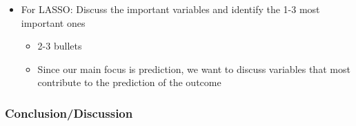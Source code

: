 \documentclass[
  letterpaper,
  DIV=11,
  numbers=noendperiod]{scrartcl}
\providecommand{\tightlist}{%
  \setlength{\itemsep}{0pt}\setlength{\parskip}{0pt}}\usepackage{longtable,booktabs,array}
\begin{document}
\begin{itemize}
  \begin{itemize}
  \tightlist
  \item
    2-3 bullets
  \item
    Interpreting the explanatory variable's relationship with IAT score
    is the most important thing to report!!

    \begin{itemize}
    \tightlist
    \item
      When doing this, make sure you account for ALL interactions: If
      your explanatory variable has multiple interactions and you are
      trying to interpret one, then what does that mean about the other
      variables involved in the other interactions? If this is
      confusing, please make an appointment with me!!
    \end{itemize}
  \end{itemize}
\item
  {For LASSO:} Discuss the important variables and identify the 1-3 most
  important ones

  \begin{itemize}
  \tightlist
  \item
    2-3 bullets
  \item
    Since our main focus is prediction, we want to discuss variables
    that most contribute to the prediction of the outcome
  \end{itemize}
\end{itemize}

\subsubsection{Conclusion/Discussion}\label{conclusiondiscussion}
\end{document}
